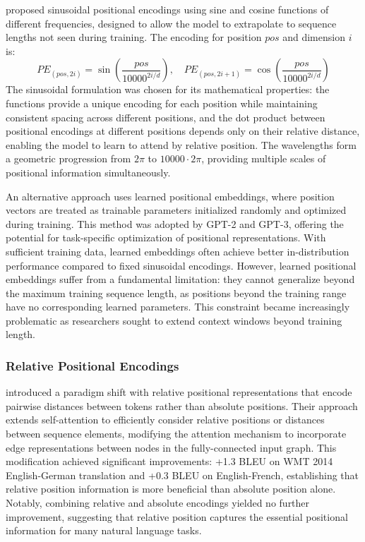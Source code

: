 \documentclass[11pt,letterpaper]{article}
\begin{document}
\cite{vaswani2017attention} proposed sinusoidal positional encodings using sine and cosine functions of different frequencies, designed to allow the model to extrapolate to sequence lengths not seen during training. The encoding for position $pos$ and dimension $i$ is:
\begin{equation}
PE_{(pos, 2i)} = \sin\left(\frac{pos}{10000^{2i/d}}\right), \quad PE_{(pos, 2i+1)} = \cos\left(\frac{pos}{10000^{2i/d}}\right)
\end{equation}
The sinusoidal formulation was chosen for its mathematical properties: the functions provide a unique encoding for each position while maintaining consistent spacing across different positions, and the dot product between positional encodings at different positions depends only on their relative distance, enabling the model to learn to attend by relative position. The wavelengths form a geometric progression from $2\pi$ to $10000 \cdot 2\pi$, providing multiple scales of positional information simultaneously.

An alternative approach uses learned positional embeddings, where position vectors are treated as trainable parameters initialized randomly and optimized during training. This method was adopted by GPT-2 and GPT-3, offering the potential for task-specific optimization of positional representations. With sufficient training data, learned embeddings often achieve better in-distribution performance compared to fixed sinusoidal encodings. However, learned positional embeddings suffer from a fundamental limitation: they cannot generalize beyond the maximum training sequence length, as positions beyond the training range have no corresponding learned parameters. This constraint became increasingly problematic as researchers sought to extend context windows beyond training length.

\subsubsection{Relative Positional Encodings}

\cite{shaw2018self} introduced a paradigm shift with relative positional representations that encode pairwise distances between tokens rather than absolute positions. Their approach extends self-attention to efficiently consider relative positions or distances between sequence elements, modifying the attention mechanism to incorporate edge representations between nodes in the fully-connected input graph. This modification achieved significant improvements: +1.3 BLEU on WMT 2014 English-German translation and +0.3 BLEU on English-French, establishing that relative position information is more beneficial than absolute position alone. Notably, combining relative and absolute encodings yielded no further improvement, suggesting that relative position captures the essential positional information for many natural language tasks.
\end{document}
